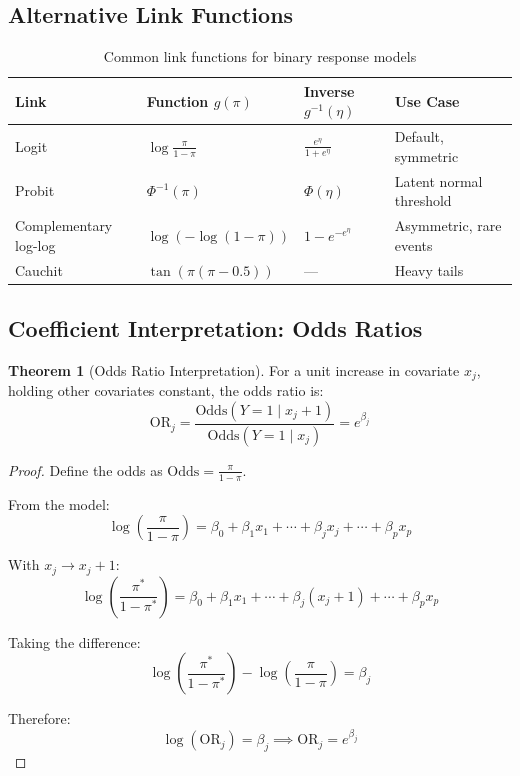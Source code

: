 \documentclass[11pt,letterpaper]{article}
\theoremstyle{definition}
\newtheorem{theorem}{Theorem}[section]
\begin{document}
\subsection{Alternative Link Functions}

\begin{table}[h]
\centering
\begin{tabular}{@{}llll@{}}
\toprule
\textbf{Link} & \textbf{Function} $g(\pi)$ & \textbf{Inverse} $g^{-1}(\eta)$ & \textbf{Use Case} \\
\midrule
Logit & $\log\frac{\pi}{1-\pi}$ & $\frac{e^\eta}{1+e^\eta}$ & Default, symmetric \\
Probit & $\Phi^{-1}(\pi)$ & $\Phi(\eta)$ & Latent normal threshold \\
Complementary log-log & $\log(-\log(1-\pi))$ & $1 - e^{-e^\eta}$ & Asymmetric, rare events \\
Cauchit & $\tan(\pi(\pi - 0.5))$ & --- & Heavy tails \\
\bottomrule
\end{tabular}
\caption{Common link functions for binary response models}
\label{tab:links}
\end{table}

\subsection{Coefficient Interpretation: Odds Ratios}

\begin{theorem}[Odds Ratio Interpretation]
For a unit increase in covariate $x_j$, holding other covariates constant, the odds ratio is:
\begin{equation}
    \text{OR}_j = \frac{\text{Odds}(Y=1 \mid x_j + 1)}{\text{Odds}(Y=1 \mid x_j)} = e^{\beta_j}
\end{equation}
\end{theorem}

\begin{proof}
Define the odds as $\text{Odds} = \frac{\pi}{1-\pi}$.

From the model:
\begin{equation}
    \log\left(\frac{\pi}{1-\pi}\right) = \beta_0 + \beta_1 x_1 + \cdots + \beta_j x_j + \cdots + \beta_p x_p
\end{equation}

With $x_j \to x_j + 1$:
\begin{equation}
    \log\left(\frac{\pi^*}{1-\pi^*}\right) = \beta_0 + \beta_1 x_1 + \cdots + \beta_j (x_j + 1) + \cdots + \beta_p x_p
\end{equation}

Taking the difference:
\begin{equation}
    \log\left(\frac{\pi^*}{1-\pi^*}\right) - \log\left(\frac{\pi}{1-\pi}\right) = \beta_j
\end{equation}

Therefore:
\begin{equation}
    \log\left(\text{OR}_j\right) = \beta_j \implies \text{OR}_j = e^{\beta_j}
\end{equation}
\end{proof}
\end{document}
